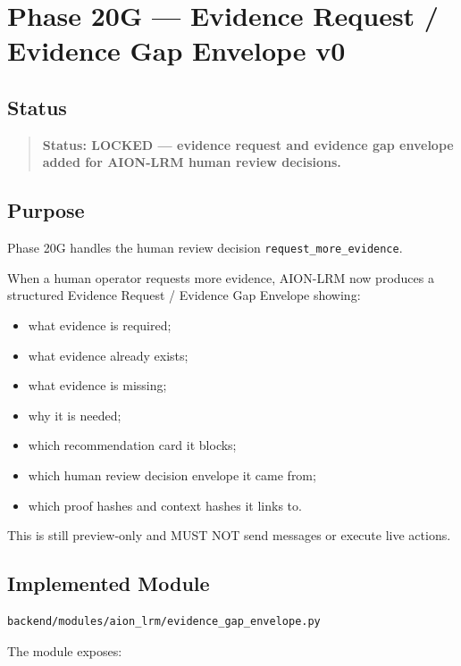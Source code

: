 \section{Phase 20G --- Evidence Request / Evidence Gap Envelope v0}
\label{sec:phase20g-evidence-gap-envelope-v0}

\subsection{Status}

\begin{quote}
\textbf{Status: LOCKED --- evidence request and evidence gap envelope added for AION-LRM human review decisions.}
\end{quote}

\subsection{Purpose}

Phase 20G handles the human review decision \texttt{request\_more\_evidence}.

When a human operator requests more evidence, AION-LRM now produces a structured Evidence Request / Evidence Gap Envelope showing:

\begin{itemize}
  \item what evidence is required;
  \item what evidence already exists;
  \item what evidence is missing;
  \item why it is needed;
  \item which recommendation card it blocks;
  \item which human review decision envelope it came from;
  \item which proof hashes and context hashes it links to.
\end{itemize}

This is still preview-only and MUST NOT send messages or execute live actions.

\subsection{Implemented Module}

\begin{verbatim}
backend/modules/aion_lrm/evidence_gap_envelope.py
\end{verbatim}

The module exposes:

